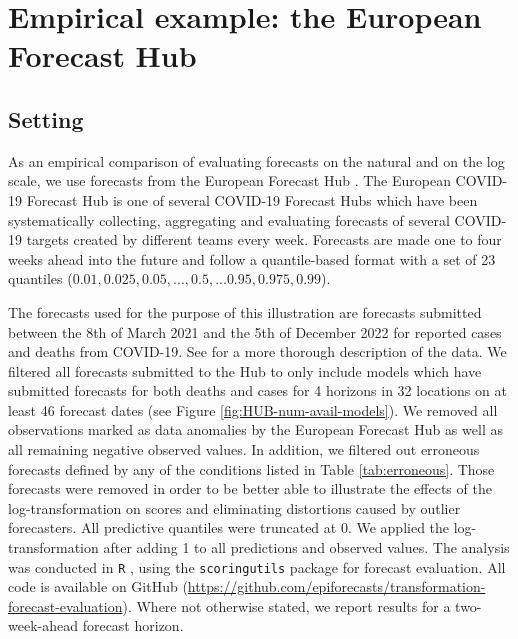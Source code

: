 \documentclass{article}
\begin{document}
\section{Empirical example: the European Forecast Hub}
\label{sec:results}

\subsection{Setting}
\label{sec:HUB-setting}

As an empirical comparison of evaluating forecasts on the natural and on the log scale, we use forecasts from the European Forecast Hub \citep{europeancovid-19forecasthubEuropeanCovid19Forecast2021, sherrattPredictivePerformanceMultimodel2022}. 
The European COVID-19 Forecast Hub is one of several COVID-19 Forecast Hubs \citep{cramerEvaluationIndividualEnsemble2021, bracherShorttermForecastingCOVID192021} which have been systematically collecting, aggregating and evaluating forecasts of several COVID-19 targets created by different teams every week. Forecasts are made one to four weeks ahead into the future and follow a quantile-based format with a set of 23 quantiles ($0.01, 0.025, 0.05, ..., 0.5, ... 0.95, 0.975, 0.99$). 

The forecasts used for the purpose of this illustration are forecasts submitted between the 8th of March 2021 and the 5th of December 2022 for reported cases and deaths from COVID-19. See \cite{sherrattPredictivePerformanceMultimodel2022} for a more thorough description of the data. We filtered all forecasts submitted to the Hub to only include models which have submitted forecasts for both deaths and cases for 4 horizons in 32 locations on at least 46 forecast dates (see Figure \ref{fig:HUB-num-avail-models}). We removed all observations marked as data anomalies by the European Forecast Hub \citep{sherrattPredictivePerformanceMultimodel2022} as well as all remaining negative observed values. In addition, we filtered out erroneous forecasts defined by any of the conditions listed in Table \ref{tab:erroneous}. Those forecasts were removed in order to be better able to illustrate the effects of the log-transformation on scores and eliminating distortions caused by outlier forecasters. All predictive quantiles were truncated at 0. We applied the log-transformation after adding 1 to all predictions and observed values. The analysis was conducted in \texttt{R} \citep{R}, using the \texttt{scoringutils} package \citep{bosseEvaluatingForecastsScoringutils2022} for forecast evaluation. All code is available on GitHub 
(\url{https://github.com/epiforecasts/transformation-forecast-evaluation}). Where not otherwise stated, we report results for a two-week-ahead forecast horizon. 
\end{document}
